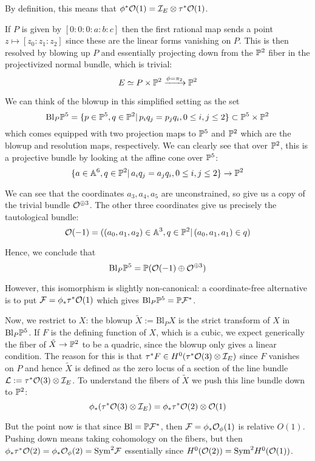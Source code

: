 By definition, this means that $\phi^* \O(1)=\calI_E \otimes \tau^*\O(1)$.

If $P$ is given by $[0:0:0:a:b:c]$ then the first rational map sends a point $z \mapsto [z_0:z_1:z_2]$ since these are the linear forms vanishing on $P$. This is then resolved by blowing up $P$ and essentially projecting down from the $\P^2$ fiber in the projectivized normal bundle, which is trivial:  $$E \simeq P \times \P^2 \xrightarrow{\phi = \pi_2} \P^2$$

We can think of the blowup in this simplified setting as the set $$\mathrm{Bl}_P \P^5 = \{p\in \P^5, q\in \P^2 |\, p_iq_j=p_jq_i, 0\leq i,j \leq 2\} \subset \P^5 \times \P^2$$
which comes equipped with two projection maps to $\P^5$ and $\P^2$ which are the blowup and resolution maps, respectively. We can clearly see that over $\P^2$, this is a projective bundle by looking at the affine cone over $\P^5$: $$\{ a\in \A^6, q\in \P^2|\,a_iq_j=a_jq_i, 0\leq i,j \leq 2\}\rightarrow \P^2$$

We can see that the coordinates $a_3, a_4, a_5$ are unconstrained, so give us a copy of the trivial bundle $\O^{\oplus 3}$. The other three coordinates give us precisely the tautological bundle: $$\O(-1)=((a_0,a_1,a_2)\in \A^3, q\in \P^2|\, (a_0, a_1, a_1)\in q)$$

Hence, we conclude that $$\mathrm{Bl}_P \P^5 = \P (\O(-1)\oplus \O^{\oplus 3})$$

However, this isomorphism is slightly non-canonical: a coordinate-free alternative is to put $\calF = \phi_* \tau^* \O(1)$ which gives $\mathrm{Bl}_P \P^5 = \P \calF^*$.

Now, we restrict to $X$: the blowup $\tilde{X}:=\mathrm{Bl}_P X$ is the strict transform of $X$ in $\mathrm{Bl}_P \P^5$. If $F$ is the defining function of $X$, which is a cubic, we expect generically the fiber of $\tilde{X}\rightarrow \P^2$ to be a quadric, since the blowup only gives a linear condition. The reason for this is that $\tau^*F \in H^0(\tau^* \O(3) \otimes \calI_E)$ since $F$ vanishes on $P$ and hence $\tilde{X}$ is defined as the zero locus of a section of the line bundle $\calL := \tau^* \O(3) \otimes \calI_E$. To understand the fibers of $\tilde{X}$ we push this line bundle down to $\P^2$: $$\phi_*(\tau^* \O(3) \otimes \calI_E)=\phi_* \tau^* \O(2) \otimes \O(1)$$

But the point now is that since $\mathrm{Bl}=\P \calF^*$, then $\calF =\phi_* \O_\phi(1)$ is relative $O(1)$. Pushing down means taking cohomology on the fibers, but then $\phi_* \tau^* \O(2)=\phi_* \O_\phi(2)=\mathrm{Sym}^2 \calF$ essentially since $H^0(\O(2))=\mathrm{Sym}^2 H^0(\O(1))$. 

